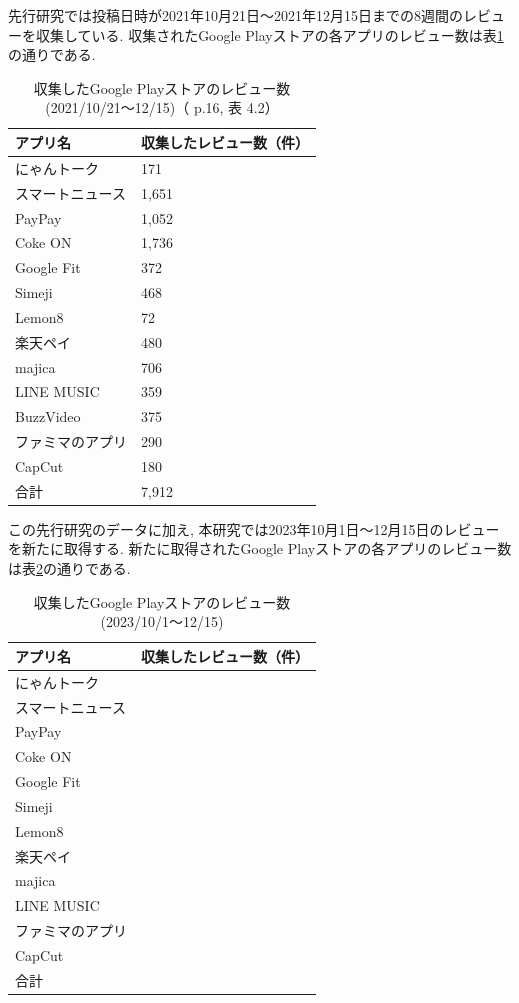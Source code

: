 先行研究では投稿日時が2021年10月21日〜2021年12月15日までの8週間のレビューを収集している. 収集されたGoogle Playストアの各アプリのレビュー数は表\ref{tb:rawreviewnum}の通りである. 
\begin{table}[H]
  \caption{収集したGoogle Playストアのレビュー数(2021/10/21〜12/15)（\cite{kawatsura} p.16, 表 4.2）}
  \label{tb:rawreviewnum}
  \begin{center}
  \begin{tabular}{l|l}
    \hline
    アプリ名&収集したレビュー数（件）\\\hline\hline
    にゃんトーク&171\\\hline
    スマートニュース&1,651\\\hline
    PayPay&1,052\\\hline
    Coke ON&1,736\\\hline
    Google Fit&372\\\hline
    Simeji&468\\\hline
    Lemon8&72\\\hline
    楽天ペイ&480\\\hline
    majica&706\\\hline
    LINE MUSIC&359\\\hline
    BuzzVideo&375\\\hline
    ファミマのアプリ&290\\\hline
    CapCut&180\\\hline\hline
    合計&7,912
  \end{tabular}\end{center}
\end{table}

この先行研究のデータに加え, 本研究では2023年10月1日〜12月15日のレビューを新たに取得する. 新たに取得されたGoogle Playストアの各アプリのレビュー数は表\ref{tb:rawreviewnum2023}の通りである. 
\begin{table}[H]
  \caption{収集したGoogle Playストアのレビュー数(2023/10/1〜12/15)}
  \label{tb:rawreviewnum2023}
  \begin{center}
  \begin{tabular}{l|l}
    \hline
    アプリ名&収集したレビュー数（件）\\\hline\hline
    にゃんトーク&\\\hline
    スマートニュース&\\\hline
    PayPay&\\\hline
    Coke ON&\\\hline
    Google Fit&\\\hline
    Simeji&\\\hline
    Lemon8&\\\hline
    楽天ペイ&\\\hline
    majica&\\\hline
    LINE MUSIC&\\\hline
    ファミマのアプリ&\\\hline
    CapCut&\\\hline\hline
    合計&
  \end{tabular}\end{center}
\end{table}

